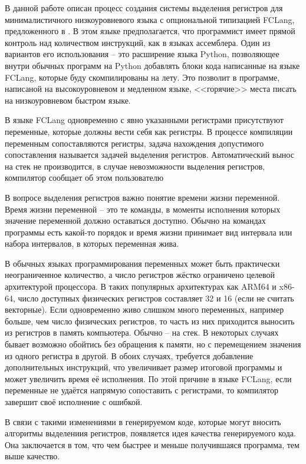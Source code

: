 \documentclass[a4paper,14pt]{extarticle}
\begin{document}
В данной работе описан процесс создания системы выделения регистров для
минималистичного низкоуровневого языка с опциональной типизацией FCLang, предложенного в \cite{____2023}.
В этом языке предполагается, что программист имеет прямой контроль над количеством инструкций, как в языках ассемблера.
Один из вариантов его использования -- это расширение языка Python, позволяющее внутри обычных программ на Python 
добавлять блоки кода написанные на языке FCLang, которые буду скомпилированы на лету. 
Это позволит в программе, написаной на высокоуровневом и медленном языке,  <<горячие>> места писать на низкоуровневом быстром языке.

В языке FCLang одновременно с явно указанными регистрами присутствуют переменные, которые должны вести себя как регистры.
В процессе компиляции переменным сопоставляются регистры, задача нахождения допустимого сопоставления называется задачей выделения регистров.
Автоматический вынос на стек не производится, в случае невозможности выделения регистров, компилятор сообщает об этом пользователю

В вопросе выделения регистров важно понятие времени жизни переменной.
Время жизни переменной -- это те команды, в моменты исполнения которых значение переменной должно оставаться доступно.
Обычно на командах программы есть какой-то порядок и время жизни принимает вид интервала или набора интервалов, в которых переменная жива.

В обычных языках программирования переменных может быть практически неограниченное количество, а число регистров жёстко ограничено целевой архитектурой процессора.
В таких популярных архитектурах как ARM64 и x86-64, число доступных физических регистров составляет 32 и 16 (если не считать векторные).
Если одновременно живо слишком много переменных, например больше, чем число физических регистров,
то часть из них приходится выносить из регистров в память компьютера.
Обычно -- на стек.
В некоторых случаях бывает возможно обойтись без обращения к памяти, но с перемещением значения из одного регистра в другой.
В обоих случаях, требуется добавление дополнительных инструкций, что увеличивает размер итоговой программы и может увеличить время её исполнения.
По этой причине в языке FCLang, если переменные не удаётся напрямую сопоставить с регистрами, то компилятор завершит своё исполнение с ошибкой.

В связи с такими изменениями в генерируемом коде, которые могут вносить алгоритмы выделениия регистров, появляется идея качества генерируемого кода.
Она заключается в том, что чем быстрее и меньше получившаяся программа, тем выше качество.
\end{document}
